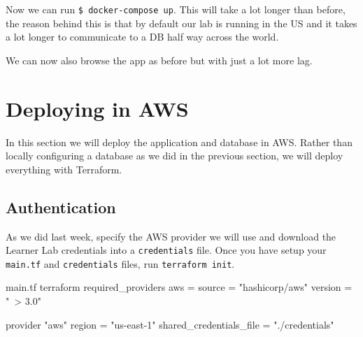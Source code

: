 \documentclass{csse4400}
\begin{document}
Now we can run \lstinline[]{$ docker-compose up}.
This will take a lot longer than before,
the reason behind this is that by default our lab is running in the US and it takes a lot longer to communicate to a DB half way across the world.


We can now also browse the app as before but with just a lot more lag.

\section{Deploying in AWS}\label{sect:terraform}

In this section we will deploy the application and database in AWS.
Rather than locally configuring a database as we did in the previous section,
we will deploy everything with Terraform.

\subsection{Authentication}

As we did last week,
specify the AWS provider we will use and download the Learner Lab credentials into a \texttt{credentials} file.
Once you have setup your \texttt{main.tf} and \texttt{credentials} files, run \lstinline{terraform init}.

\begin{code}[language=terraform]{main.tf}
terraform {
  required_providers {
    aws = {
      source = "hashicorp/aws"
      version = "~> 3.0"
    }
  }
}

provider "aws" {
  region = "us-east-1"
  shared_credentials_file = "./credentials"
}
\end{code}
\end{document}
